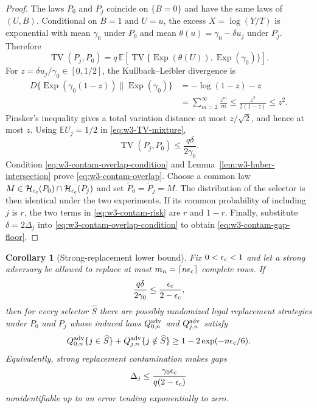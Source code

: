 \documentclass[11pt]{article}
\newtheorem{corollary}[theorem]{Corollary}
\theoremstyle{remark}
\newcommand{\E}{\mathbb E}
\newcommand{\TV}{\operatorname{TV}}
\begin{document}
\begin{proof}
The laws $P_0$ and $P_j$ coincide on $\{B=0\}$ and have the same laws of
$(U,B)$.  Conditional on $B=1$ and $U=u$, the excess
$X=\log(Y/T)$ is exponential with mean $\gamma_0$ under $P_0$ and mean
$\theta(u)=\gamma_0-\delta u_j$ under $P_j$.  Therefore
\begin{equation}
 \TV(P_j,P_0)
 =q\,\E\left[
 \TV\{\operatorname{Exp}(\theta(U)),
       \operatorname{Exp}(\gamma_0)\}
 \right].
 \label{eq:w3-TV-mixture}
\end{equation}
For $z=\delta u_j/\gamma_0\in[0,1/2]$, the Kullback--Leibler divergence is
\begin{align}
 D\{\operatorname{Exp}(\gamma_0(1-z))\|
    \operatorname{Exp}(\gamma_0)\}
 &=-\log(1-z)-z\nonumber\\
 &=\sum_{m=2}^\infty\frac{z^m}{m}
 \le\frac{z^2}{2(1-z)}\le z^2.
 \label{eq:w3-exp-KL}
\end{align}
Pinsker's inequality gives a total variation distance at most $z/\sqrt2$,
and hence at most $z$.  Using $\E U_j=1/2$ in
\eqref{eq:w3-TV-mixture},
\begin{equation}
 \TV(P_j,P_0)\le\frac{q\delta}{2\gamma_0}.
 \label{eq:w3-TV-bound}
\end{equation}
Condition \eqref{eq:w3-contam-overlap-condition} and
Lemma~\ref{lem:w3-huber-intersection} prove
\eqref{eq:w3-contam-overlap}.  Choose a common law
$M\in\mathcal H_{\epsilon_{\rm c}}(P_0)
\cap\mathcal H_{\epsilon_{\rm c}}(P_j)$ and set
$\widetilde P_0=\widetilde P_j=M$.  The distribution of the selector is then
identical under the two experiments.  If its common probability of including
$j$ is $r$, the two terms in \eqref{eq:w3-contam-risk} are $r$ and $1-r$.
Finally, substitute $\delta=2\Delta_j$ into
\eqref{eq:w3-contam-overlap-condition} to obtain
\eqref{eq:w3-contam-gap-floor}.
\end{proof}

\begin{corollary}[Strong-replacement lower bound]
\label{cor:w3-strong-contam-lower}
Fix $0<\epsilon_{\rm c}<1$ and let a strong adversary be allowed to replace at
most $m_n=\lceil n\epsilon_{\rm c}\rceil$ complete rows.  If
\begin{equation}
 \frac{q\delta}{2\gamma_0}
 \le\frac{\epsilon_{\rm c}}{2-\epsilon_{\rm c}},
 \label{eq:w3-strong-overlap-condition}
\end{equation}
then for every selector $\widehat S$ there are possibly randomized legal
replacement strategies under $P_0$ and $P_j$ whose induced laws
$Q_{0,n}^{\rm adv}$ and $Q_{j,n}^{\rm adv}$ satisfy
\begin{equation}
 Q_{0,n}^{\rm adv}\{j\in\widehat S\}
 +Q_{j,n}^{\rm adv}\{j\notin\widehat S\}
 \ge1-2\exp(-n\epsilon_{\rm c}/6).
 \label{eq:w3-strong-contam-risk}
\end{equation}
Equivalently, strong replacement contamination makes gaps
\begin{equation}
 \Delta_j\le
 \frac{\gamma_0\epsilon_{\rm c}}
      {q(2-\epsilon_{\rm c})}
 \label{eq:w3-strong-gap-floor}
\end{equation}
nonidentifiable up to an error tending exponentially to zero.
\end{corollary}
\end{document}
